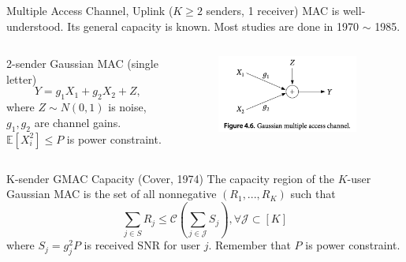\documentclass[aspectratio=43, 10pt]{beamer}
\begin{document}
    \begin{frame}[t]{Multiple Access Channel, Uplink \small ($K\geq2$ senders, 1 receiver)}
    \vspace{-1.1em}
    MAC is well-understood. Its general capacity is known. Most studies are done in 1970 $\sim$ 1985. 
    
    \vspace{-0.8em}
    \begin{columns}
    \begin{column}{0.6\textwidth}
        \begin{block}{2-sender Gaussian MAC (single letter)}
        \small
            $$Y = g_1 X_1 + g_2 X_2 + Z,$$ 
            where $Z\sim N(0,1)$ is noise, $g_1, g_2$ are channel gains. $\mathbb{E}[X_i^2] \leq P$ is power constraint. 
        \end{block}
    \end{column}
    \begin{column}{0.4\textwidth}
        \begin{figure}
        \centering
            \includegraphics[width=0.9\textwidth]{figures/gaussian2txMAC.png}
        \end{figure}
    \end{column}
    \end{columns}

    \vspace{-0.8em}
    \begin{columns}

    \begin{column}{0.57\textwidth}
    \small
        \begin{block}{K-sender GMAC Capacity (Cover, 1974)}
        The capacity region of the $K$-user Gaussian MAC is the set of all nonnegative $(R_1,...,R_K)$ such that $$\sum_{j \in S} R_j \leq \mathcal{C}(\sum_{j\in \mathcal{J}} S_j), \forall \mathcal{J} \subset [K]$$
            where $S_j= g_j^2 P$ is received SNR for user $j$. Remember that $P$ is power constraint. 
        \end{block}
    \end{column}
    

\end{columns}
\end{frame}
\end{document}
